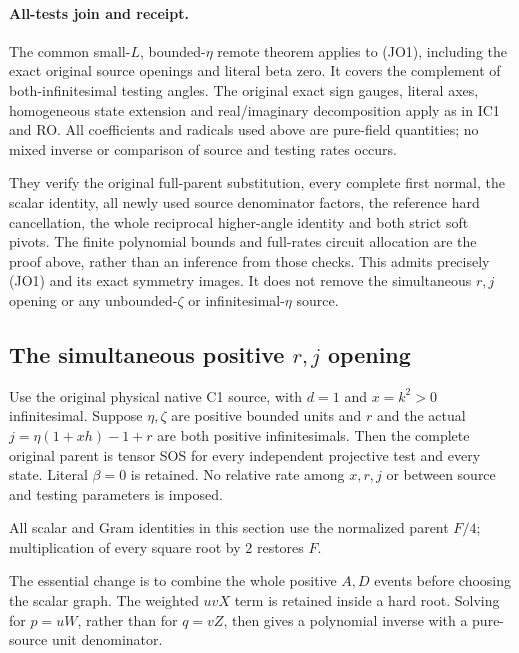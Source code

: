 \paragraph{All-tests join and receipt.}
The common small-$L$, bounded-$\eta$ remote theorem applies to
(JO1), including the exact original source openings and literal beta
zero. It covers the complement of both-infinitesimal testing angles.
The original exact sign gauges, literal axes, homogeneous state
extension and real/imaginary decomposition apply as in IC1 and RO.
All coefficients and radicals used above are pure-field quantities;
no mixed inverse or comparison of source and testing rates occurs.

 They verify
the original full-parent substitution, every complete first normal,
the scalar identity, all newly used source denominator factors,
the reference hard cancellation, the whole reciprocal higher-angle
identity and both strict soft pivots. The finite polynomial bounds
and full-rates circuit allocation are the proof above, rather than
an inference from those checks. This admits precisely (JO1) and its
exact symmetry images. It does not remove the simultaneous
$r,j$ opening or any unbounded-$\zeta$ or infinitesimal-$\eta$ source.



\subsection{The simultaneous positive $r,j$ opening}

\label{component:pbf6de1d7328a}

\label{pbf6de1d7328a:sec:r13-c1-simultaneous-rj}

\begin{theorem}
Use the original physical native C1 source, with $d=1$ and $x=k^2>0$
infinitesimal. Suppose $\eta,\zeta$ are positive bounded units and
$r$ and the actual $j=\eta(1+xh)-1+r$ are both positive
infinitesimals. Then the complete original parent is tensor SOS for
every independent projective test and every state. Literal $\beta=0$
is retained. No relative rate among $x,r,j$ or between source and
testing parameters is imposed.
\end{theorem}

All scalar and Gram identities in this section use the normalized
parent $F/4$; multiplication of every square root by $2$ restores $F$.

The essential change is to combine the whole positive $A,D$ events
before choosing the scalar graph. The weighted $uvX$ term is retained
inside a hard root. Solving for $p=uW$, rather than for $q=vZ$,
then gives a polynomial inverse with a pure-source unit denominator.

